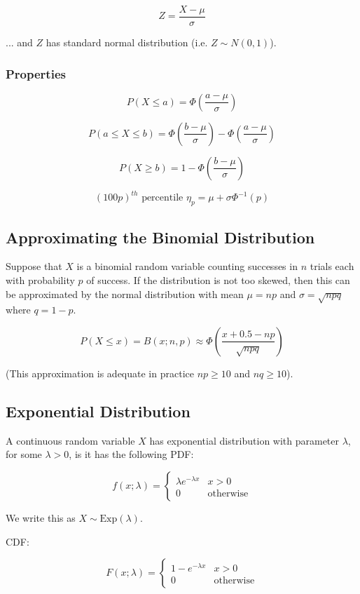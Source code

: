 $$ Z = \frac{X-\mu}{\sigma} $$

... and $Z$ has standard normal distribution (i.e. $Z \sim N(0,1)$).

\subsubsection*{Properties}

$$ P(X \leq a) = \Phi\left(\frac{a-\mu}{\sigma}\right) $$

$$ P(a \leq X \leq b) = \Phi\left(\frac{b-\mu}{\sigma}\right) - \Phi\left(\frac{a-\mu}{\sigma}\right) $$

$$ P(X \geq b) = 1 - \Phi\left(\frac{b-\mu}{\sigma}\right) $$

$$ (100p)^{th} \text{ percentile } \eta_p = \mu + \sigma \Phi^{-1}(p) $$

\subsection*{Approximating the Binomial Distribution}

Suppose that $X$ is a binomial random variable counting successes in $n$ trials each with probability $p$ of success. If the distribution is not too skewed, then this can be approximated by the normal distribution with mean $\mu = np$ and $\sigma = \sqrt{npq}$ where $q=1-p$.

$$ P(X \leq x) = B(x;n,p) \approx \Phi\left(\frac{x+0.5-np}{\sqrt{npq}}\right) $$

(This approximation is adequate in practice $np\geq 10$ and $nq \geq 10$).

\subsection*{Exponential Distribution}

A continuous random variable $X$ has exponential distribution with parameter $\lambda$, for some $\lambda > 0$, is it has the following PDF:

$$ f(x; \lambda) = \begin{cases} \lambda e^{-\lambda x} & x > 0 \\ 0 & \text{otherwise} \end{cases} $$

We write this as $X \sim \text{Exp}(\lambda)$.

CDF:

$$ F(x; \lambda) = \begin{cases} 1 - e^{-\lambda x} & x > 0 \\ 0 & \text{otherwise} \end{cases} $$

